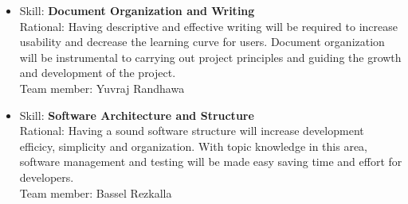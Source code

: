 \documentclass[12pt]{article}
\begin{document}
\begin{itemize}
		\item Skill: \textbf{Document Organization and Writing}
		\\ Rational: Having descriptive and effective writing will be required to increase usability and decrease the learning curve for users. Document organization will be instrumental to carrying out project principles and guiding the growth and development of the project.
		\\ Team member: Yuvraj Randhawa
		
		\item Skill: \textbf{Software Architecture and Structure}
		\\ Rational: Having a sound software structure will increase development efficicy, simplicity and organization. With topic knowledge in this area, software management and testing will be made easy saving time and effort for developers.
		\\ Team member: Bassel Rezkalla
		
		
	\end{itemize}
\end{document}
